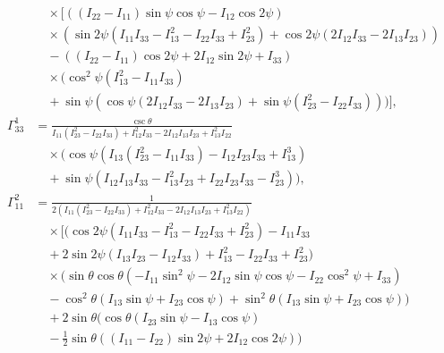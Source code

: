 \documentclass[lineno, pdflatex,sn-mathphys-ay]{sn-jnl}
\theoremstyle{thmstyleone}%
\theoremstyle{thmstyletwo}%
\theoremstyle{thmstylethree}%
\begin{document}
\begin{appendices}
\begin{align}
    &\quad \times \bigg[ ((I_{22}-I_{11}) \sin \psi \cos \psi-I_{12} \cos 2\psi) \nonumber \\
    &\quad \times \left(\sin 2\psi \left(I_{11} I_{33}-I_{13}^2-I_{22} I_{33}+I_{23}^2\right)+\cos 2\psi (2 I_{12} I_{33}-2 I_{13} I_{23})\right) \nonumber \\
    &\quad -((I_{22}-I_{11}) \cos 2\psi+2 I_{12} \sin 2\psi+I_{33}) \nonumber \\
    &\quad \times \Big(\cos ^2\psi \left(I_{13}^2-I_{11} I_{33}\right) \nonumber \\
    &\quad +\sin \psi \left(\cos \psi (2 I_{12} I_{33}-2 I_{13} I_{23})+\sin \psi \left(I_{23}^2-I_{22} I_{33}\right)\right)\Big) \bigg], \nonumber \\
    \Gamma^{1}_{33} &= \frac{\csc \theta}{I_{11} \left(I_{23}^2-I_{22} I_{33}\right)+I_{12}^2 I_{33}-2 I_{12} I_{13} I_{23}+I_{13}^2 I_{22}} \nonumber \\
    &\quad \times \Big( \cos \psi \left(I_{13} \left(I_{23}^2-I_{11} I_{33}\right)-I_{12} I_{23} I_{33}+I_{13}^3\right) \nonumber \\
    &\quad +\sin \psi \left(I_{12} I_{13} I_{33}-I_{13}^2 I_{23}+I_{22} I_{23} I_{33}-I_{23}^3\right) \Big), \nonumber \\
    \Gamma^{2}_{11} &= \frac{1}{2 \left(I_{11} \left(I_{23}^2-I_{22} I_{33}\right)+I_{12}^2 I_{33}-2 I_{12} I_{13} I_{23}+I_{13}^2 I_{22}\right)} \nonumber \\
    &\quad \times \bigg[ \Big(\cos 2\psi \left(I_{11} I_{33}-I_{13}^2-I_{22} I_{33}+I_{23}^2\right)-I_{11} I_{33} \nonumber \\
    &\quad +2 \sin 2\psi (I_{13} I_{23}-I_{12} I_{33})+I_{13}^2-I_{22} I_{33}+I_{23}^2\Big) \nonumber \\
    &\quad \times \bigg(\sin \theta \cos \theta \left(-I_{11} \sin ^2\psi-2 I_{12} \sin \psi \cos \psi-I_{22} \cos ^2\psi+I_{33}\right) \nonumber \\
    &\quad -\cos ^2\theta (I_{13} \sin \psi+I_{23} \cos \psi)+\sin ^2\theta (I_{13} \sin \psi+I_{23} \cos \psi)\bigg) \nonumber \\
    &\quad +2 \sin \theta \bigg(\cos \theta (I_{23} \sin \psi-I_{13} \cos \psi) \nonumber \\
    &\quad -\frac{1}{2} \sin \theta ((I_{11}-I_{22}) \sin 2\psi+2 I_{12} \cos 2\psi)\bigg) \nonumber \\

\end{align}
\end{appendices}
\end{document}
